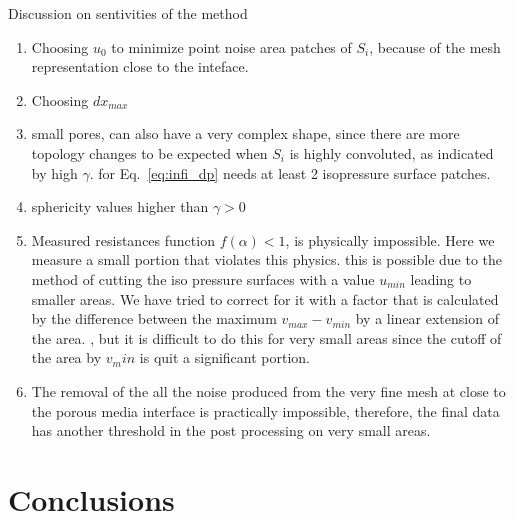 \documentclass[draft]{agujournal2019}
\begin{document}
Discussion on sentivities of the method 
\begin{enumerate}
	\item Choosing $u_0$ to minimize point noise area patches of $S_i$, because of the mesh representation close to the inteface.
	\item Choosing $dx_{max}$
	\item small pores, can also have a very complex shape, since there are more topology changes to be expected when $S_i$ is highly convoluted, as indicated by high $\gamma$. for Eq.~\ref{eq:infi_dp} needs at least 2 isopressure surface patches. 
	\item sphericity values higher than $\gamma >0$
	\item Measured resistances function $f(\alpha) < 1$, is physically impossible. Here we measure a small portion that violates this physics. this is possible due to the method of cutting the iso pressure surfaces with a value $u_{min}$ leading to smaller areas. We have tried to correct for it with a factor that is calculated by the difference between the maximum $v_{max}-v_{min}$ by a linear extension of the area.  , but it is difficult to do this for very small areas since the cutoff of the area by $v_min$ is quit a significant portion. 
	\item The removal of the all the noise produced from the very fine mesh at close to the porous media interface is practically impossible, therefore, the final data has another threshold in the post processing on very small areas.   
\end{enumerate}


\section{Conclusions}






\end{document}

